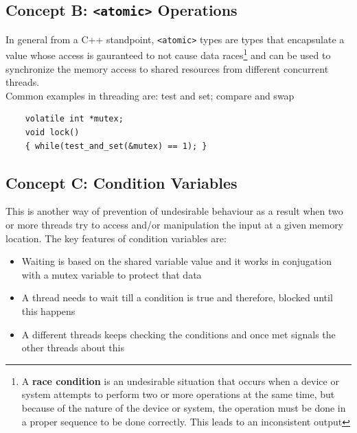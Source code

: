 \documentclass[12pt, a4paper]{report}
\begin{document}
\subsection*{Concept B: \texttt{<atomic>} Operations}
In general from a C++ standpoint, \texttt{<atomic>} types are types that encapsulate a value whose access is gauranteed to not cause 
data races{\footnote[2]{A {\bfseries{race condition}} is an undesirable situation that occurs when a device or system attempts to 
perform two or more operations at the same time, but because of the nature of the device or system, the operation must be done in a 
proper sequence to be done correctly. This leads to an inconsistent output}} and can be used to synchronize the memory access to shared 
resources from different concurrent threads. \\
Common examples in threading are: test and set; compare and swap
\begin{verbatim}
    volatile int *mutex;
    void lock()
    { while(test_and_set(&mutex) == 1); }
\end{verbatim}

\subsection*{Concept C: Condition Variables}
This is another way of prevention of undesirable behaviour as a result when two or more threads try to access and/or manipulation the 
input at a given memory location. The key features of condition variables are:
\begin{itemize}
    \item Waiting is based on the shared variable value and it works in conjugation with a mutex variable to protect that data
    \item A thread needs to wait till a condition is true and therefore, blocked until this happens
    \item A different threads keeps checking the conditions and once met signals the other threads about this
\end{itemize}
\end{document}
